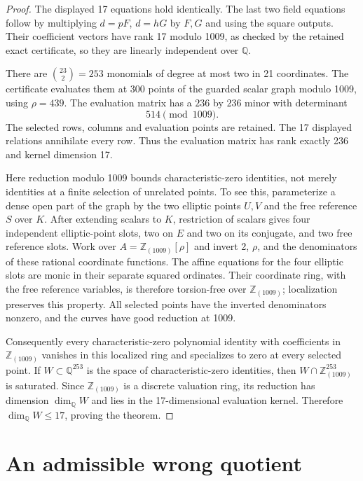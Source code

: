 \documentclass[11pt,a4paper]{article}
\newcommand{\Q}{\mathbb Q}
\newcommand{\Z}{\mathbb Z}
\begin{document}
\begin{proof}
The displayed 17 equations hold identically. The last two field
equations follow by multiplying $d=pF$, $d=hG$ by $F,G$ and using
the square outputs. Their coefficient vectors have rank 17 modulo
1009, as checked by the retained exact certificate, so they are
linearly independent over $\Q$.

There are $\binom{23}{2}=253$ monomials of degree at most two
in 21 coordinates. The certificate evaluates them at 300 points
of the guarded scalar graph modulo 1009, using $\rho=439$.
The evaluation matrix has a $236$ by $236$ minor with determinant
\[
                             514\pmod {1009}.
\]
The selected rows, columns and evaluation points are retained. The
17 displayed relations annihilate every row. Thus the evaluation
matrix has rank exactly 236 and kernel dimension 17.

Here reduction modulo 1009 bounds characteristic-zero identities,
not merely identities at a finite selection of unrelated points.
To see this, parameterize a dense open part of the graph by the
two elliptic points $U,V$ and the free reference $S$ over $K$.
After extending scalars to $K$, restriction of scalars gives four
independent elliptic-point slots, two on $E$ and two on its conjugate,
and two free reference slots. Work over
$A=\Z_{(1009)}[\rho]$ and invert 2, $\rho$, and the denominators
of these rational coordinate functions. The affine equations for
the four elliptic slots are monic in their separate squared
ordinates. Their coordinate ring, with the free reference variables,
is therefore torsion-free over $\Z_{(1009)}$; localization preserves
this property. All selected points have the inverted denominators
nonzero, and the curves have good reduction at 1009.

Consequently every characteristic-zero polynomial identity with
coefficients in $\Z_{(1009)}$ vanishes in this localized ring and
specializes to zero at every selected point. If $W\subset\Q^{253}$
is the space of characteristic-zero identities, then
$W\cap\Z_{(1009)}^{253}$ is saturated. Since
$\Z_{(1009)}$ is a discrete valuation ring, its reduction has
dimension $\dim_\Q W$ and lies in the 17-dimensional evaluation
kernel. Therefore $\dim_\Q W\le17$, proving the theorem.
\end{proof}

\section{An admissible wrong quotient}
\end{document}
